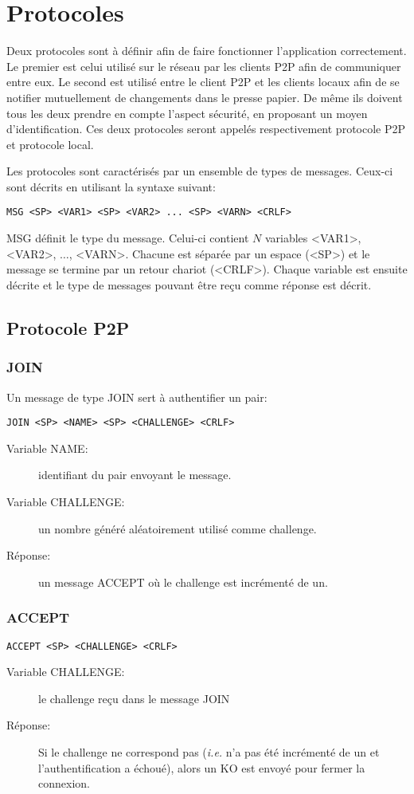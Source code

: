 \section{Protocoles}
Deux protocoles sont à définir afin de faire fonctionner l'application
correctement. Le premier est celui utilisé sur le réseau par les clients
P2P afin de communiquer entre eux. Le second est utilisé entre le client
P2P et les clients locaux afin de se notifier mutuellement de changements
dans le presse papier. De même ils doivent tous les deux prendre en compte
l'aspect sécurité, en proposant un moyen d'identification.
Ces deux protocoles seront appelés respectivement protocole P2P et protocole
local.

Les protocoles sont caractérisés par un ensemble de types de messages.
Ceux-ci sont décrits en utilisant la syntaxe suivant:
\begin{verbatim}
MSG <SP> <VAR1> <SP> <VAR2> ... <SP> <VARN> <CRLF>
\end{verbatim}
MSG définit le type du message. Celui-ci contient $N$ variables
<VAR1>, <VAR2>, $\ldots$, <VARN>. Chacune est séparée par un espace (<SP>)
et le message se termine par un retour chariot (<CRLF>). Chaque variable est
ensuite décrite et le type de messages pouvant être reçu comme réponse est
décrit.

\subsection{Protocole P2P}
\subsubsection*{JOIN}
Un message de type JOIN sert à authentifier un pair:
\begin{verbatim}
JOIN <SP> <NAME> <SP> <CHALLENGE> <CRLF>
\end{verbatim}
\begin{description}
\item[Variable NAME:] identifiant du pair envoyant le message.
\item[Variable CHALLENGE:] un nombre généré aléatoirement utilisé comme
  challenge.
\item[Réponse:] un message ACCEPT où le challenge est incrémenté de un.
\end{description}

\hrulefill

\subsubsection*{ACCEPT}
\begin{verbatim}
ACCEPT <SP> <CHALLENGE> <CRLF>
\end{verbatim}
\begin{description}
\item[Variable CHALLENGE:] le challenge reçu dans le message JOIN
\item[Réponse:] Si le challenge ne correspond pas (\emph{i.e.} n'a pas été
  incrémenté de un et l'authentification a échoué), alors un KO est envoyé
  pour fermer la connexion.
\end{description}

